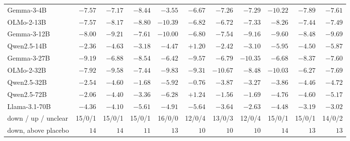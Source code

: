 \begin{table}[tb]
\begin{tabular}{lrrrrrrrrrr}
Gemma-3-4B & $\mathbf{-7.57}$ & $\mathbf{-7.17}$ & $\mathbf{-8.44}$ & $\mathbf{-3.55}$ & $\mathbf{-6.67}$ & $\mathbf{-7.26}$ & $\mathbf{-7.29}$ & $\mathbf{-10.22}$ & $\mathbf{-7.89}$ & $\mathbf{-7.61}$ \\
OLMo-2-13B & $\mathbf{-7.57}$ & $\mathbf{-8.17}$ & $\mathbf{-8.80}$ & $\mathbf{-10.39}$ & $\mathbf{-6.82}$ & $\mathbf{-6.72}$ & $\mathbf{-7.33}$ & $\mathbf{-8.26}$ & $\mathbf{-7.44}$ & $\mathbf{-7.49}$ \\
Gemma-3-12B & $\mathbf{-8.00}$ & $\mathbf{-9.21}$ & $\mathbf{-7.61}$ & $\mathbf{-10.00}$ & $\mathbf{-6.80}$ & $\mathbf{-7.54}$ & $\mathbf{-9.16}$ & $\mathbf{-9.60}$ & $\mathbf{-8.48}$ & $\mathbf{-9.69}$ \\
Qwen2.5-14B & $\mathbf{-2.36}$ & $\mathbf{-4.63}$ & $\mathbf{-3.18}$ & $\mathbf{-4.47}$ & $+1.20$ & $\mathbf{-2.42}$ & $\mathbf{-3.10}$ & $\mathbf{-5.95}$ & $\mathbf{-4.50}$ & $\mathbf{-5.87}$ \\
Gemma-3-27B & $\mathbf{-9.19}$ & $\mathbf{-6.88}$ & $\mathbf{-8.54}$ & $\mathbf{-6.42}$ & $\mathbf{-9.57}$ & $\mathbf{-6.79}$ & $\mathbf{-10.35}$ & $\mathbf{-6.68}$ & $\mathbf{-8.37}$ & $\mathbf{-7.60}$ \\
OLMo-2-32B & $\mathbf{-7.92}$ & $\mathbf{-9.58}$ & $\mathbf{-7.44}$ & $\mathbf{-9.83}$ & $\mathbf{-9.31}$ & $\mathbf{-10.67}$ & $\mathbf{-8.48}$ & $\mathbf{-10.03}$ & $\mathbf{-6.27}$ & $\mathbf{-7.69}$ \\
Qwen2.5-32B & $-2.54$ & $\mathbf{-4.60}$ & $-1.68$ & $\mathbf{-5.92}$ & $-0.76$ & $\mathbf{-3.87}$ & $-3.27$ & $\mathbf{-3.86}$ & $\mathbf{-4.46}$ & $\mathbf{-4.72}$ \\
Qwen2.5-72B & $\mathbf{-2.06}$ & $\mathbf{-4.40}$ & $\mathbf{-3.36}$ & $\mathbf{-6.28}$ & $+1.24$ & $-1.56$ & $-1.69$ & $\mathbf{-4.76}$ & $\mathbf{-4.60}$ & $\mathbf{-5.17}$ \\
Llama-3.1-70B & $\mathbf{-4.36}$ & $\mathbf{-4.10}$ & $\mathbf{-5.61}$ & $\mathbf{-4.91}$ & $\mathbf{-5.64}$ & $\mathbf{-3.64}$ & $\mathbf{-2.63}$ & $\mathbf{-4.48}$ & $\mathbf{-3.19}$ & $\mathbf{-3.02}$ \\
\midrule down / up / unclear & 15/0/1 & 15/0/1 & 15/0/1 & 16/0/0 & 12/0/4 & 13/0/3 & 12/0/4 & 15/0/1 & 15/0/1 & 14/0/2 \\
down, above placebo & $14$ & $14$ & $11$ & $13$ & $10$ & $10$ & $10$ & $14$ & $13$ & $13$ \\
\bottomrule\end{tabular}
\\[6pt]
\begin{tabular}{lrrrr}\toprule

\end{tabular}
\end{table}
